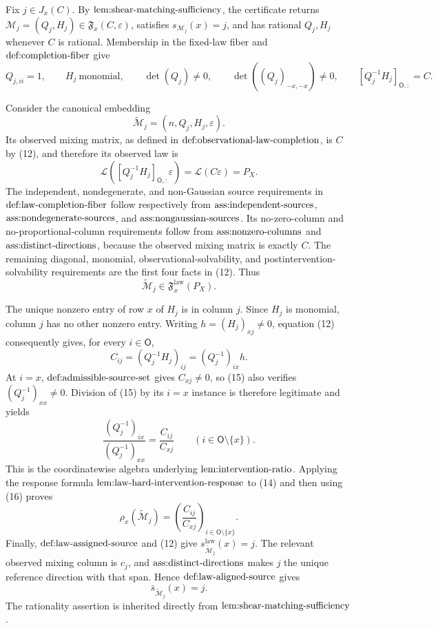 Fix \(j\in J_x(C)\).  By \(\textnormal{lem:shear-matching-sufficiency}\), the certificate returns \(\mathcal M_j=(Q_j,H_j)\in\mathfrak F_x(C,\varepsilon)\), satisfies \(s_{\mathcal M_j}(x)=j\), and has rational \(Q_j,H_j\) whenever \(C\) is rational.  Membership in the fixed-law fiber and \(\textnormal{def:completion-fiber}\) give
\[
 Q_{j,ii}=1,\qquad
 H_j\ \text{monomial},\qquad
 \det(Q_j)\ne0,\qquad
 \det((Q_j)_{-x,-x})\ne0,\qquad
 [Q_j^{-1}H_j]_{\mathsf O,:}=C.                                            \tag{12}
\]

Consider the canonical embedding
\[
 \widetilde{\mathcal M}_j=(n,Q_j,H_j,\varepsilon).
\]
Its observed mixing matrix, as defined in \(\textnormal{def:observational-law-completion}\), is \(C\) by (12), and therefore its observed law is
\[
 \mathcal L\!\left([Q_j^{-1}H_j]_{\mathsf O,:}\varepsilon\right)
 =\mathcal L(C\varepsilon)=P_X.                                            \tag{13}
\]
The independent, nondegenerate, and non-Gaussian source requirements in \(\textnormal{def:law-completion-fiber}\) follow respectively from \(\textnormal{ass:independent-sources}\), \(\textnormal{ass:nondegenerate-sources}\), and \(\textnormal{ass:nongaussian-sources}\).  Its no-zero-column and no-proportional-column requirements follow from \(\textnormal{ass:nonzero-columns}\) and \(\textnormal{ass:distinct-directions}\), because the observed mixing matrix is exactly \(C\).  The remaining diagonal, monomial, observational-solvability, and postintervention-solvability requirements are the first four facts in (12).  Thus
\[
 \widetilde{\mathcal M}_j\in\mathfrak F_x^{\mathrm{law}}(P_X).              \tag{14}
\]

The unique nonzero entry of row \(x\) of \(H_j\) is in column \(j\).  Since \(H_j\) is monomial, column \(j\) has no other nonzero entry.  Writing \(h=(H_j)_{xj}\ne0\), equation (12) consequently gives, for every \(i\in\mathsf O\),
\[
 C_{ij}=(Q_j^{-1}H_j)_{ij}=(Q_j^{-1})_{ix}h.                               \tag{15}
\]
At \(i=x\), \(\textnormal{def:admissible-source-set}\) gives \(C_{xj}\ne0\), so (15) also verifies \((Q_j^{-1})_{xx}\ne0\).  Division of (15) by its \(i=x\) instance is therefore legitimate and yields
\[
 \frac{(Q_j^{-1})_{ix}}{(Q_j^{-1})_{xx}}
 =\frac{C_{ij}}{C_{xj}}
 \qquad(i\in\mathsf O\setminus\{x\}).                                      \tag{16}
\]
This is the coordinatewise algebra underlying \(\textnormal{lem:intervention-ratio}\).  Applying the response formula \(\textnormal{lem:law-hard-intervention-response}\) to (14) and then using (16) proves
\[
 \rho_x(\widetilde{\mathcal M}_j)
 =\left(\frac{C_{ij}}{C_{xj}}\right)_{i\in\mathsf O\setminus\{x\}}.          \tag{17}
\]
Finally, \(\textnormal{def:law-assigned-source}\) and (12) give
\(s_{\widetilde{\mathcal M}_j}^{\mathrm{law}}(x)=j\).  The relevant observed mixing column is \(c_j\), and \(\textnormal{ass:distinct-directions}\) makes \(j\) the unique reference direction with that span.  Hence \(\textnormal{def:law-aligned-source}\) gives
\[
 \bar s_{\widetilde{\mathcal M}_j}(x)=j.
\]
The rationality assertion is inherited directly from \(\textnormal{lem:shear-matching-sufficiency}\).